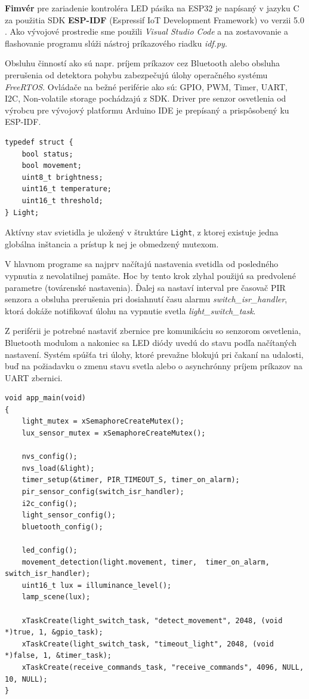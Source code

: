 \documentclass[12pt, a4paper]{article}
\begin{document}
\textbf{Fimvér} pre zariadenie kontroléra LED pásika na ESP32 je napísaný v jazyku C za použitia SDK \textbf{ESP-IDF} (Espressif IoT Development Framework) vo verzii 5.0 \cite{noauthor_esp-idf_nodate}. Ako vývojové prostredie sme použili \emph{Visual Studio Code} a na zostavovanie a flashovanie programu slúži nástroj príkazového riadku \emph{idf.py}. 

Obsluhu činností ako sú napr. príjem príkazov cez Bluetooth alebo obsluha prerušenia od detektora pohybu zabezpečujú úlohy operačného systému \emph{FreeRTOS}. Ovládače na bežné periférie ako sú: GPIO, PWM, Timer, UART, I2C, Non-volatile storage pochádzajú z SDK. Driver pre senzor osvetlenia od výrobcu pre vývojový platformu Arduino IDE je prepísaný a prispôsobený ku ESP-IDF.

\begin{lstlisting}[style=cstyle,caption=Štruktúra vlastností svietidla,label={lst:light-settings}]
typedef struct {
    bool status;
    bool movement;
    uint8_t brightness;
    uint16_t temperature;
    uint16_t threshold;
} Light;
\end{lstlisting}
Aktívny stav svietidla je uložený v štruktúre \verb|Light|, z ktorej existuje jedna globálna inštancia a prístup k nej je obmedzený
mutexom.

V hlavnom programe sa najprv načítajú nastavenia svetidla od posledného vypnutia z nevolatilnej pamäte. Hoc by tento krok zlyhal použijú sa predvolené parametre (továrenské nastavenia). Ďalej sa nastaví interval pre časovač PIR senzora a obsluha prerušenia pri dosiahnutí času alarmu \emph{switch\_isr\_handler}, ktorá dokáže notifikovať úlohu na vypnutie svetla \emph{light\_switch\_task}. 

Z periférii je potrebné nastaviť zbernice pre komunikáciu so senzorom osvetlenia, Bluetooth modulom a nakoniec sa LED diódy uvedú do stavu podľa načítaných nastavení. Systém spúšťa tri úlohy, ktoré prevažne blokujú pri čakaní na udalosti, buď na požiadavku o zmenu stavu svetla alebo o asynchrónny príjem príkazov na UART zbernici.

\begin{lstlisting}[style=cstyle,caption=Inicializácia hardvéru a spustenie úloh,label={lst:firmware-main},
 morekeywords={xTaskCreate,xSemaphoreCreateMutex,timer_on_alarm,switch_isr_handler,light_switch_task,receive_commands_task}]
void app_main(void)
{
    light_mutex = xSemaphoreCreateMutex();
    lux_sensor_mutex = xSemaphoreCreateMutex();

    nvs_config();  
    nvs_load(&light);
    timer_setup(&timer, PIR_TIMEOUT_S, timer_on_alarm);
    pir_sensor_config(switch_isr_handler);
    i2c_config(); 
    light_sensor_config();
    bluetooth_config();

	led_config();
    movement_detection(light.movement, timer,  timer_on_alarm, switch_isr_handler);
    uint16_t lux = illuminance_level();
    lamp_scene(lux);  

    xTaskCreate(light_switch_task, "detect_movement", 2048, (void *)true, 1, &gpio_task);
    xTaskCreate(light_switch_task, "timeout_light", 2048, (void *)false, 1, &timer_task);
    xTaskCreate(receive_commands_task, "receive_commands", 4096, NULL, 10, NULL);
}
\end{lstlisting}
\end{document}
